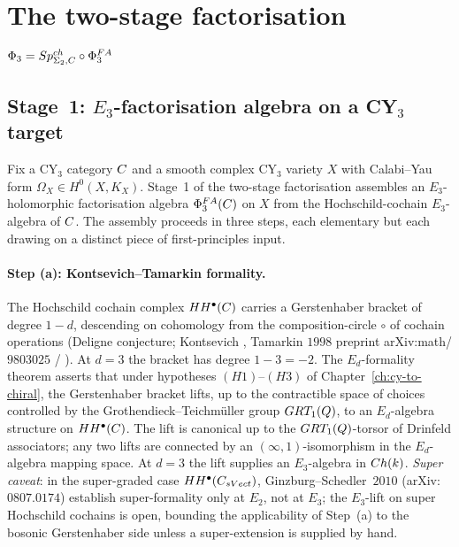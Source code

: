 \section{The two-stage factorisation \texorpdfstring{$\Phi_3 = Sp^{ch}_{\Sigma_2, C} \circ \Phi^{FA}_3$}{Phi3 = SpCh o PhiFA3}}
\label{sec:fa-two-stage}

\subsection{Stage~1: $E_3$-factorisation algebra on a CY$_3$ target}
\label{subsec:fa-stage-one}

Fix a CY$_3$ category $C$ and a smooth complex CY$_3$ variety $X$
with Calabi--Yau form $\Omega_X \in H^0(X, K_X)$. Stage~1 of the
two-stage factorisation assembles an $E_3$-holomorphic factorisation
algebra $\Phi^{FA}_3(C)$ on $X$ from the Hochschild-cochain $E_3$-algebra
of $C$. The assembly proceeds in three steps, each elementary but
each drawing on a distinct piece of first-principles input.

\paragraph{Step (a): Kontsevich--Tamarkin formality.}
The Hochschild cochain complex $HH^\bullet(C)$ carries a Gerstenhaber
bracket of degree $1 - d$, descending on cohomology from the
composition-circle $\circ$ of cochain operations
(Deligne conjecture; Kontsevich \cite{Kontsevich1997,Kontsevich1999},
Tamarkin $1998$ preprint arXiv:math/$9803025$ / \cite{Tamarkin2007}).
At $d = 3$ the bracket has degree $1 - 3 = -2$. The $E_d$-formality
theorem asserts that under hypotheses $(H1)$--$(H3)$ of
Chapter~\ref{ch:cy-to-chiral}, the Gerstenhaber bracket lifts, up to
the contractible space of choices controlled by the
Grothendieck--Teichm\"uller group $GRT_1(Q)$, to an $E_d$-algebra
structure on $HH^\bullet(C)$. The lift is canonical up to the
$GRT_1(Q)$-torsor of Drinfeld associators; any two lifts are
connected by an $(\infty, 1)$-isomorphism in the $E_d$-algebra mapping
space. At $d = 3$ the lift supplies an $E_3$-algebra in $Ch(k)$.
\emph{Super caveat}: in the super-graded case $HH^\bullet(C_{sVect})$,
Ginzburg--Schedler~$2010$ (arXiv:$0807.0174$) establish super-formality
only at $E_2$, not at $E_3$; the $E_3$-lift on super Hochschild cochains
is open, bounding the applicability of Step~(a) to the bosonic
Gerstenhaber side unless a super-extension is supplied by hand.


